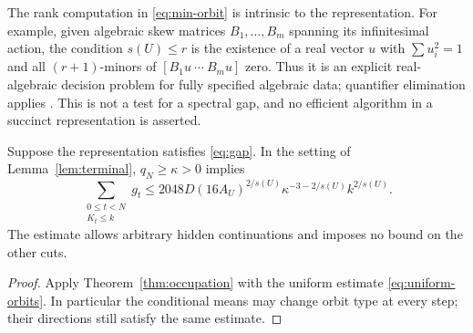 The rank computation in \eqref{eq:min-orbit} is intrinsic to the
representation. For example, given algebraic skew matrices
$B_1,\ldots,B_m$ spanning its infinitesimal action, the condition
$s(U)\le r$ is the existence of a real vector $u$ with
$\sum u_i^2=1$ and all $(r+1)$-minors of $[B_1u\ \cdots\ B_mu]$
zero. Thus it is an explicit real-algebraic decision problem for
fully specified algebraic data; quantifier elimination applies
\cite{BPR}. This is not a test for a spectral gap, and no efficient
algorithm in a succinct representation is asserted.

\begin{corollary}\label{cor:intrinsic-budget}
Suppose the representation satisfies \eqref{eq:gap}. In the setting
of Lemma~\ref{lem:terminal}, $q_N\ge\kappa>0$ implies
\begin{equation}\label{eq:intrinsic-budget}
 \sum_{\substack{0\le t<N\\K_t\le k}} g_t
       \le 2048D(16A_U)^{2/s(U)}
                    \kappa^{-3-2/s(U)}k^{2/s(U)}.
\end{equation}
The estimate allows arbitrary hidden continuations and imposes no
bound on the other cuts.
\end{corollary}
\begin{proof}
Apply Theorem~\ref{thm:occupation} with the uniform estimate
\eqref{eq:uniform-orbits}. In particular the conditional means may
change orbit type at every step; their directions still satisfy the
same estimate.
\end{proof}

